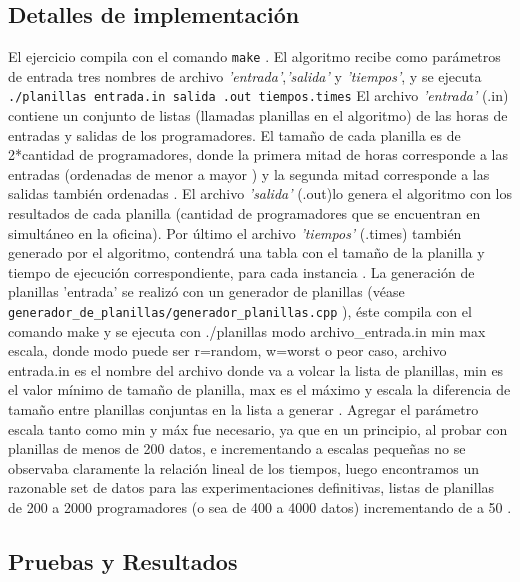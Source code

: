 \subsection{Detalles de implementación}
El ejercicio compila con el comando \texttt{make} .
\newline
El algoritmo recibe como parámetros de entrada tres nombres de archivo \emph{'entrada'},\emph{'salida'} y \emph{'tiempos'}, y se ejecuta \texttt{./planillas entrada.in salida .out tiempos.times}
\newline
El archivo \emph{'entrada'} (.in) contiene un conjunto de listas (llamadas planillas en el algoritmo) de las horas de  entradas y salidas de los programadores.
\newline
El tamaño de cada planilla es de  2*cantidad de programadores, donde la primera mitad de horas corresponde a las entradas (ordenadas de menor a mayor ) y la segunda mitad corresponde a las salidas también ordenadas .
\newline
El archivo \emph{'salida'} (.out)lo genera el algoritmo con los resultados de cada planilla  (cantidad de programadores que se encuentran en simultáneo en la oficina).
\newline
Por último el archivo \emph{'tiempos'} (.times)  también generado por el algoritmo, contendrá una tabla con el tamaño de la planilla y tiempo de ejecución correspondiente, para cada instancia .
\newline
La generación de planillas 'entrada' se realizó con un generador de planillas (véase \texttt{generador\_de\_planillas/generador\_planillas.cpp} ), éste compila con el comando make y se ejecuta con 
./planillas modo archivo\_entrada.in  min max escala, donde modo puede ser r=random, w=worst o peor caso, archivo entrada.in es el nombre del archivo donde va a volcar la lista de planillas, min es el valor mínimo de tamaño de planilla, max es el máximo y escala la diferencia de tamaño entre planillas conjuntas en la lista a generar .
\newline
Agregar el parámetro escala tanto como min y máx fue necesario, ya que en un principio, al probar con planillas de menos de 200 datos, e incrementando a escalas pequeñas no se observaba claramente la relación lineal de los tiempos, luego encontramos un razonable set de datos para las experimentaciones definitivas, listas de planillas de 200 a 2000 programadores (o sea de 400 a 4000 datos) incrementando de a 50 .  

\subsection{Pruebas y Resultados}

